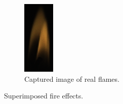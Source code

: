 \begin{figure}[htpb]
\begin{subfigure}[t]{0.15\textwidth}
                \includegraphics[width=\textwidth]{img/vox0087}
                \caption{Captured image of real flames.}
                \label{fig:vox0087}
        \end{subfigure}
        \caption{Superimposed fire effects.}
\end{figure}